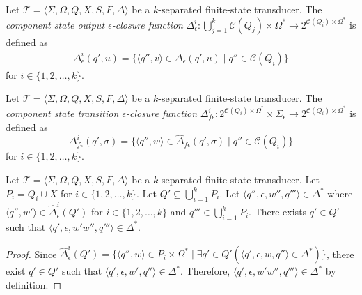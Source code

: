 \begin{definition}
  Let $\mathcal{T} = \langle \Sigma, \Omega, Q, X, S, F, \Delta \rangle$ be a
  $k$-separated finite-state transducer. The \emph{component state output
  $\epsilon$-closure function} $\Delta_\epsilon^i : \bigcup_{j=1}^k \mathcal{C}(Q_j)
  \times \Omega^* \rightarrow 2^{\mathcal{C}(Q_i) \times \Omega^*}$ is defined as
  \begin{align*}
    \Delta_\epsilon^i(q', u) = \{ \langle q'', v \rangle \in \Delta_\epsilon(q', u)
    \mid q'' \in \mathcal{C}(Q_i) \}
  \end{align*}
  for $i \in \{ 1, 2, \ldots, k \}$.
\end{definition}

\begin{definition}
  Let $\mathcal{T} = \langle \Sigma, \Omega, Q, X, S, F, \Delta \rangle$ be a
  $k$-separated finite-state transducer. The \emph{component state transition
  $\epsilon$-closure function} $\Delta_{f\epsilon}^i : 2^{\mathcal{C}(Q_i) \times
  \Omega^*} \times \Sigma_\epsilon \rightarrow 2^{\mathcal{C}(Q_i) \times \Omega^*}$
  is defined as
  \begin{equation*}
    \Delta_{f\epsilon}^i(q', \sigma) = \{ \langle q'', w \rangle \in
    \hat{\Delta}_{f\epsilon}(q', \sigma) \mid q'' \in \mathcal{C}(Q_i) \}
  \end{equation*}
  for $i \in \{ 1, 2, \ldots, k \}$.
\end{definition}

\iffalse
\begin{proposition}
  Let $\mathcal{T} = \langle \Sigma, \Omega, Q, X, S, F, \Delta \rangle$ be a
  $k$-separated finite-state transducer. Let $P_i = Q_i \cup X$ for $i \in \{ 1, 2,
  \ldots, k \}$. Let $Q' \subseteq \bigcup_{i=1}^k P_i$. Let $\langle q'', \epsilon,
  w'', q''' \rangle \in \Delta^*$ where $\langle q'', w' \rangle \in
  \hat{\Delta}_\epsilon^i(Q')$ for $i \in \{ 1, 2, \ldots, k \}$ and $q''' \in
  \bigcup_{i=1}^k P_i$. There exists $q' \in Q'$ such that $\langle q', \epsilon,
  w'w'', q''' \rangle \in \Delta^*$.
\end{proposition}

\begin{proof}
  Since $\hat{\Delta}_\epsilon^i(Q') = \{ \langle q'', w \rangle \in P_i \times
  \Omega^* \mid \exists q' \in Q' (\langle q', \epsilon, w, q'' \rangle \in \Delta^*)
  \}$, there exist $q' \in Q'$ such that $\langle q', \epsilon, w', q'' \rangle \in
  \Delta^*$. Therefore, $\langle q', \epsilon, w'w'', q''' \rangle \in \Delta^*$ by
  definition.
\end{proof}

